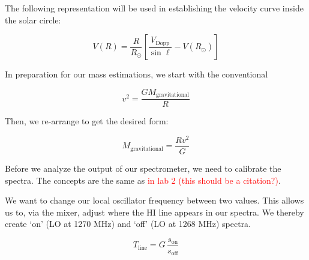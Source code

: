 \documentclass[12pt]{article}
\begin{document}
The following representation will be used in establishing the velocity curve inside the solar circle:

\begin{equation} \label{eq:vel_curve}
V(R) = \frac{R}{R_\odot} \left[ \frac{V_\text{Dopp}}{\sin \ell} - V(R_\odot) \right] 
\end{equation}





In preparation for our mass estimations, we start with the conventional

\begin{equation}
v^2 = \frac{G M_\text{gravitational}}{R} 
\end{equation}

Then, we re-arrange to get the desired form:

\begin{equation} \label{eq:mass}
M_\text{gravitational} = \frac{R v^2}{G} 
\end{equation}


Before we analyze the output of our spectrometer, we need to calibrate the spectra. The concepts are the same as \textcolor{red}{in lab 2 (this should be a citation?)}.

We want to change our local oscillator frequency between two values. This allows us to, via the mixer, adjust where the HI line appears in our spectra. We thereby create `on' (LO at 1270 MHz) and `off' (LO at 1268 MHz) spectra.

\begin{equation} \label{eq:line_shape}
T_\text{line} = G \, \frac{s_\text{on}}{s_\text{off}}
\end{equation}
\end{document}
